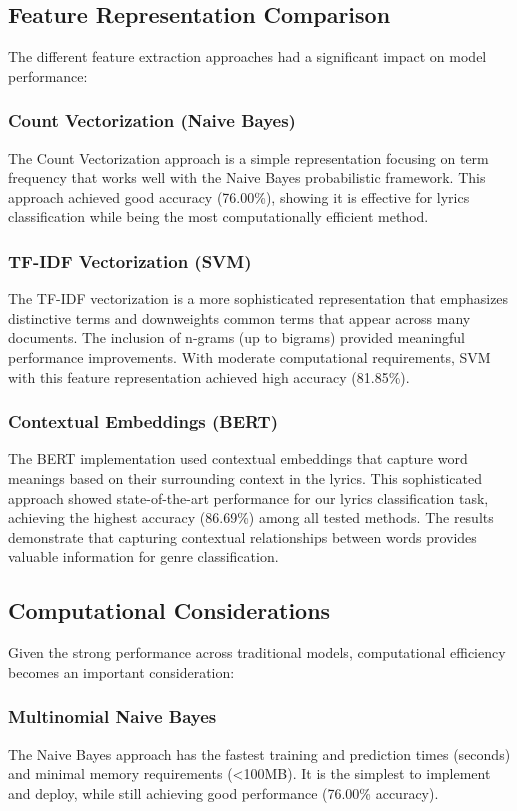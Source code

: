 \documentclass[conference]{IEEEtran}
\begin{document}
\subsection{Feature Representation Comparison}
The different feature extraction approaches had a significant impact on model performance:

\subsubsection{Count Vectorization (Naive Bayes)}
The Count Vectorization approach is a simple representation focusing on term frequency that works well with the Naive Bayes probabilistic framework. This approach achieved good accuracy (76.00\%), showing it is effective for lyrics classification while being the most computationally efficient method.

\subsubsection{TF-IDF Vectorization (SVM)}
The TF-IDF vectorization is a more sophisticated representation that emphasizes distinctive terms and downweights common terms that appear across many documents. The inclusion of n-grams (up to bigrams) provided meaningful performance improvements. With moderate computational requirements, SVM with this feature representation achieved high accuracy (81.85\%).

\subsubsection{Contextual Embeddings (BERT)}
The BERT implementation used contextual embeddings that capture word meanings based on their surrounding context in the lyrics. This sophisticated approach showed state-of-the-art performance for our lyrics classification task, achieving the highest accuracy (86.69\%) among all tested methods. The results demonstrate that capturing contextual relationships between words provides valuable information for genre classification.

\subsection{Computational Considerations}
Given the strong performance across traditional models, computational efficiency becomes an important consideration:

\subsubsection{Multinomial Naive Bayes}
The Naive Bayes approach has the fastest training and prediction times (seconds) and minimal memory requirements (<100MB). It is the simplest to implement and deploy, while still achieving good performance (76.00\% accuracy).
\end{document}
